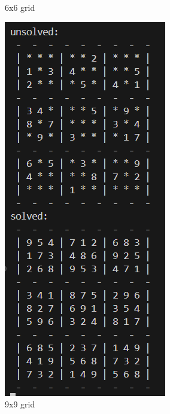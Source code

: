 \documentclass[]{final_report}
\begin{document}
\begin{figure}[ht]
\begin{minipage}{0.3\textwidth}
        \caption{6x6 grid} 
        \label{fig: terminal 6x6} 
    \end{minipage} 
    \hfill 
    \begin{minipage}{0.3\textwidth} 
        \includegraphics[width=\textwidth]{images/terminal 9x9.png} 
        \caption{9x9 grid} 
        \label{fig:terminal 9x9} 
    \end{minipage}
\end{figure}
\end{document}
